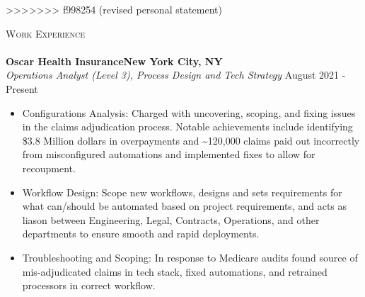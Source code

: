 \documentclass[a4paper]{article}
\newcommand{\lineunder} {
    \vspace*{-8pt} \\
    \hspace*{-18pt} \hrulefill \\
}
\newcommand{\header} [1] {
    {\hspace*{-18pt}\vspace*{6pt} \textsc{#1}}
    \vspace*{-6pt} \lineunder
}
\begin{document}
>>>>>>> f998254 (revised personal statement)
\header{Work Experience}
\vspace{1mm}
\textbf{Oscar Health Insurance\hfill New York City, NY}\\
\textit{Operations Analyst (Level 3), Process Design and Tech Strategy} \hfill August 2021 - Present\\
\vspace{-1mm}
\begin{itemize} \itemsep 1pt
    \item Configurations Analysis: Charged with uncovering, scoping, and fixing issues in the claims adjudication process. 
        Notable achievements include identifying \$3.8 Million dollars in overpayments and \textasciitilde{}120,000 claims paid out incorrectly 
        from misconfigured automations and implemented fixes to allow for recoupment.

    \item   Workflow Design: Scope new workflows, designs and sets requirements for what can/should be automated based on project requirements,
     and acts as liason between Engineering, Legal, Contracts, Operations, and other departments to ensure smooth and rapid deployments.

	\item 	Troubleshooting and Scoping: In response to Medicare audits found source of mis-adjudicated claims in tech stack, fixed automations, and retrained processors in correct workflow.
\end{itemize}
\end{document}
